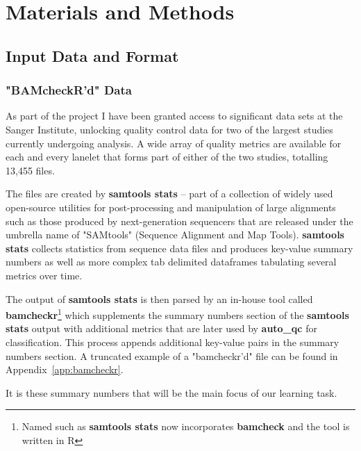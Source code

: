 \chapter{Materials and Methods}
\section{Input Data and Format}
\subsection{"BAMcheckR'd" Data}
\label{chap:bamcheckr-data}

As part of the project I have been granted access to significant data sets at the
Sanger Institute, unlocking quality control data for two of the largest studies
currently undergoing analysis. A wide array of quality metrics are available for
each and every lanelet that forms part of either of the two studies, totalling
13,455 files.


The files are created by \textbf{samtools stats} -- part of a collection of
widely used open-source utilities for post-processing and manipulation of large
alignments such as those produced by next-generation sequencers that are
released under the umbrella name of "SAMtools"\citep{samtools} (Sequence
Alignment and Map Tools). \textbf{samtools stats} collects statistics from
sequence data files and produces key-value summary numbers as well as more
complex tab delimited dataframes tabulating several metrics over time.

The output of \textbf{samtools stats} is then parsed by an in-house tool called
\textbf{bamcheckr}\footnote{Named such as \textbf{samtools stats} now incorporates
\textbf{bamcheck} and the tool is written in R} which supplements the summary
numbers section of the \textbf{samtools stats} output with additional metrics
that are later used by \textbf{auto\_qc} for classification.  This process
appends additional key-value pairs in the summary numbers section.  A truncated
example of a "bamcheckr'd" file can be found in Appendix~\ref{app:bamcheckr}.

It is these summary numbers that will be the main focus of our learning task.


